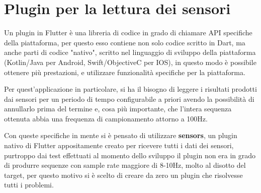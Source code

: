 \section{Plugin per la lettura dei sensori}
Un plugin in Flutter è una libreria di codice in grado di chiamare API specifiche della piattaforma, per questo esso contiene non solo codice scritto in Dart, ma anche parti di codice "nativo", scritto nel linguaggio di sviluppo della piattaforma (Kotlin/Java per Android, Swift/ObjectiveC per IOS), in questo modo è possibile ottenere più prestazioni, e utilizzare funzionalità specifiche per la piattaforma.

Per quest'applicazione in particolare, si ha il bisogno di leggere i risultati prodotti dai sensori per un periodo di tempo configurabile a priori avendo la possibilità di annullarlo prima del termine e, cosa più importante, che l'intera sequenza ottenuta abbia una frequenza di campionamento attorno a 100Hz.

Con queste specifiche in mente si è pensato di utilizzare {\bfseries sensors}\cite{sensors}, un plugin nativo di Flutter appositamente creato per ricevere tutti i dati dei sensori, purtroppo dai test effettuati al momento dello sviluppo il plugin non era in grado di produrre sequenze con sample rate maggiore di 8-10Hz, molto al disotto del target, per questo motivo si è scelto di creare da zero un plugin che risolvesse tutti i problemi.

